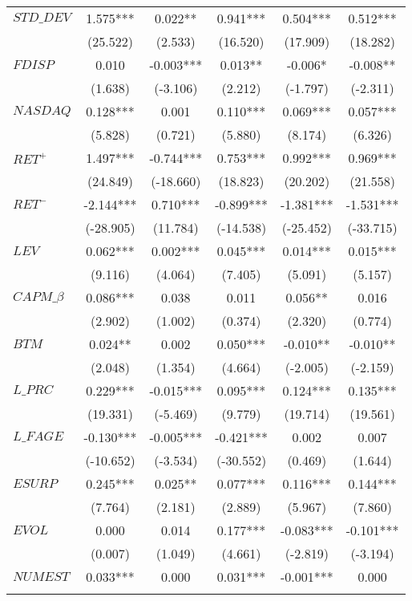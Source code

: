 \begin{xltabular}{\linewidth}{X * {5}{S[table-format=4.3]}}
\endfoot
\bottomrule
\endlastfoot
$STD\_DEV$ & 1.575*** & 0.022** & 0.941*** & 0.504*** & 0.512***\\
 & (25.522) & (2.533) & (16.520) & (17.909) & (18.282)\\
$FDISP$ & 0.010 & -0.003*** & 0.013** & -0.006* & -0.008**\\
 & (1.638) & (-3.106) & (2.212) & (-1.797) & (-2.311)\\
$NASDAQ$ & 0.128*** & 0.001 & 0.110*** & 0.069*** & 0.057***\\
\addlinespace
 & (5.828) & (0.721) & (5.880) & (8.174) & (6.326)\\
$RET^+$ & 1.497*** & -0.744*** & 0.753*** & 0.992*** & 0.969***\\
 & (24.849) & (-18.660) & (18.823) & (20.202) & (21.558)\\
$RET^-$ & -2.144*** & 0.710*** & -0.899*** & -1.381*** & -1.531***\\
 & (-28.905) & (11.784) & (-14.538) & (-25.452) & (-33.715)\\
\addlinespace
$LEV$ & 0.062*** & 0.002*** & 0.045*** & 0.014*** & 0.015***\\
 & (9.116) & (4.064) & (7.405) & (5.091) & (5.157)\\
$CAPM\_\beta$ & 0.086*** & 0.038 & 0.011 & 0.056** & 0.016\\
 & (2.902) & (1.002) & (0.374) & (2.320) & (0.774)\\
$BTM$ & 0.024** & 0.002 & 0.050*** & -0.010** & -0.010**\\
\addlinespace
 & (2.048) & (1.354) & (4.664) & (-2.005) & (-2.159)\\
$L\_PRC$ & 0.229*** & -0.015*** & 0.095*** & 0.124*** & 0.135***\\
 & (19.331) & (-5.469) & (9.779) & (19.714) & (19.561)\\
$L\_FAGE$ & -0.130*** & -0.005*** & -0.421*** & 0.002 & 0.007\\
 & (-10.652) & (-3.534) & (-30.552) & (0.469) & (1.644)\\
\addlinespace
$ESURP$ & 0.245*** & 0.025** & 0.077*** & 0.116*** & 0.144***\\
 & (7.764) & (2.181) & (2.889) & (5.967) & (7.860)\\
$EVOL$ & 0.000 & 0.014 & 0.177*** & -0.083*** & -0.101***\\
 & (0.007) & (1.049) & (4.661) & (-2.819) & (-3.194)\\
$NUMEST$ & 0.033*** & 0.000 & 0.031*** & -0.001*** & 0.000\\
\addlinespace

\end{xltabular}
